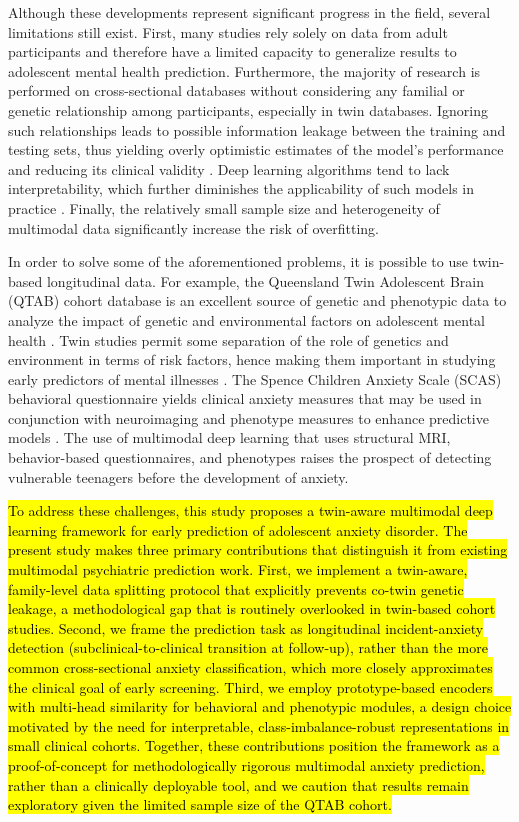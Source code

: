 \documentclass[10pt,letterpaper]{article}
\begin{document}
        Although these developments represent significant progress in the field, several limitations still exist. First, many studies rely solely on data from adult participants and therefore have a limited capacity to generalize results to adolescent mental health prediction. Furthermore, the majority of research is performed on cross-sectional databases without considering any familial or genetic relationship among participants, especially in twin databases. Ignoring such relationships leads to possible information leakage between the training and testing sets, thus yielding overly optimistic estimates of the model's performance and reducing its clinical validity \cite{ref32,ref33,ref34}. Deep learning algorithms tend to lack interpretability, which further diminishes the applicability of such models in practice \cite{ref15,ref16}. Finally, the relatively small sample size and heterogeneity of multimodal data significantly increase the risk of overfitting.



        In order to solve some of the aforementioned problems, it is possible to use twin-based longitudinal data. For example, the Queensland Twin Adolescent Brain (QTAB) cohort database is an excellent source of genetic and phenotypic data to analyze the impact of genetic and environmental factors on adolescent mental health \cite{ref32}. Twin studies permit some separation of the role of genetics and environment in terms of risk factors, hence making them important in studying early predictors of mental illnesses \cite{ref33,ref34}. The Spence Children Anxiety Scale (SCAS) behavioral questionnaire yields clinical anxiety measures that may be used in conjunction with neuroimaging and phenotype measures to enhance predictive models \cite{ref35}. The use of multimodal deep learning that uses structural MRI, behavior-based questionnaires, and phenotypes raises the prospect of detecting vulnerable teenagers before the development of anxiety.

        \hl{To address these challenges, this study proposes a twin-aware multimodal deep learning framework for early prediction of adolescent anxiety disorder. The present study makes three primary contributions that distinguish it from existing multimodal psychiatric prediction work. First, we implement a twin-aware, family-level data splitting protocol that explicitly prevents co-twin genetic leakage, a methodological gap that is routinely overlooked in twin-based cohort studies. Second, we frame the prediction task as longitudinal incident-anxiety detection (subclinical-to-clinical transition at follow-up), rather than the more common cross-sectional anxiety classification, which more closely approximates the clinical goal of early screening. Third, we employ prototype-based encoders with multi-head similarity for behavioral and phenotypic modules, a design choice motivated by the need for interpretable, class-imbalance-robust representations in small clinical cohorts. Together, these contributions position the framework as a proof-of-concept for methodologically rigorous multimodal anxiety prediction, rather than a clinically deployable tool, and we caution that results remain exploratory given the limited sample size of the QTAB cohort.}
\end{document}
